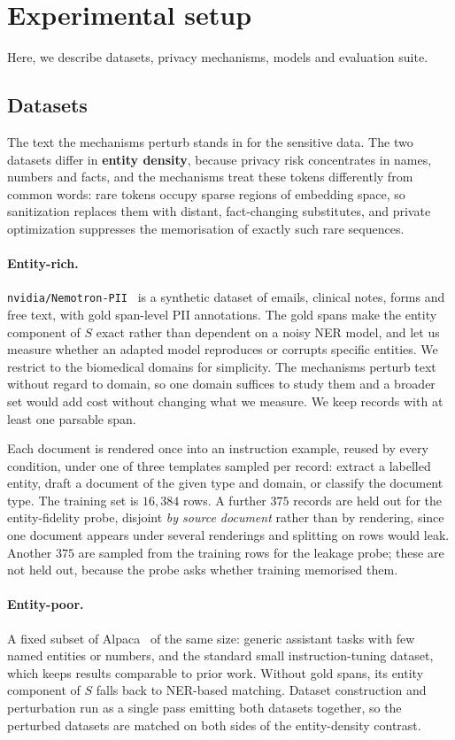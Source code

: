 \section{Experimental setup}
Here,
we describe datasets,
privacy mechanisms,
models and evaluation suite.

\subsection{Datasets}
The text the mechanisms perturb stands in for the sensitive data.
The two datasets differ in \textbf{entity density},
because privacy risk concentrates in names,
numbers and facts,
and the mechanisms treat these tokens differently from common words:
rare tokens occupy sparse regions of embedding space,
so sanitization replaces them with distant,
fact-changing substitutes,
and private optimization suppresses the memorisation of exactly such rare sequences.

\paragraph{Entity-rich.}
\texttt{nvidia/Nemotron-PII}~\citep{nvidia2025nemotronpii} is a synthetic dataset of emails,
clinical notes,
forms and free text,
with gold span-level PII annotations.
The gold spans make the entity component of $S$ exact rather than dependent on a noisy NER model,
and let us measure whether an adapted model reproduces or corrupts specific entities.
We restrict to the biomedical domains for simplicity.
The mechanisms perturb text without regard to domain,
so one domain suffices to study them and a broader set would add cost without changing what we measure.
We keep records with at least one parsable span.

Each document is rendered once into an instruction example, reused by every condition, under one of three templates sampled per record:
extract a labelled entity,
draft a document of the given type and domain,
or classify the document type.
The training set is $16{,}384$ rows.
A further $375$ records are held out for the entity-fidelity probe,
disjoint \textit{by source document} rather than by rendering,
since one document appears under several renderings and splitting on rows would leak.
Another $375$ are sampled from the training rows for the leakage probe;
these are not held out, because the probe asks whether training memorised them.

\paragraph{Entity-poor.}
A fixed subset of Alpaca~\citep{taori2023alpaca} of the same size:
generic assistant tasks with few named entities or numbers,
and the standard small instruction-tuning dataset,
which keeps results comparable to prior work.
Without gold spans,
its entity component of $S$ falls back to NER-based matching.
Dataset construction and perturbation run as a single pass emitting both datasets together,
so the perturbed datasets are matched on both sides of the entity-density contrast.

